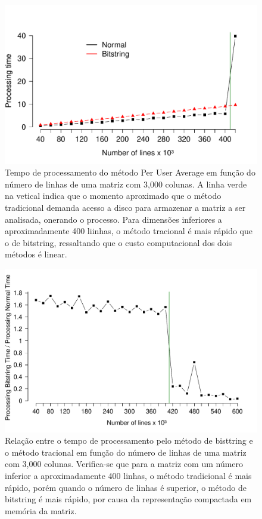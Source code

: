 \documentclass[10pt]{article}
\begin{document}
\begin{figure}[h]
  \centering
  \includegraphics[scale=0.6,clip]{fig40}
  \caption{Tempo de processamento do método Per User Average em função do número de linhas de uma matriz com 3,000 
colunas. A linha verde na vetical indica que o momento aproximado que o método tradicional demanda acesso a disco para 
armazenar a matriz a ser analisada, onerando o processo. Para dimensões inferiores a aproximadamente 400 liinhas, o 
método tracional é mais rápido que o de bitstring, ressaltando que o custo computacional dos dois métodos é linear.}
  \label{fig40}
\end{figure}

\begin{figure}[h]
  \centering
  \includegraphics[scale=0.6,clip]{fig41}
  \caption{Relação entre o tempo de processamento pelo método de bisttring e o método tracional em função do número de 
linhas de uma matriz com 3,000 colunas. Verifica-se que para a matriz com um número inferior a aproximadamente 400 
linhas, o método tradicional é mais rápido, porém quando o número de linhas é superior, o método de bitstring é mais 
rápido, por causa da representação compactada em  memória da matriz.}
  \label{fig41}
\end{figure}
\end{document}
